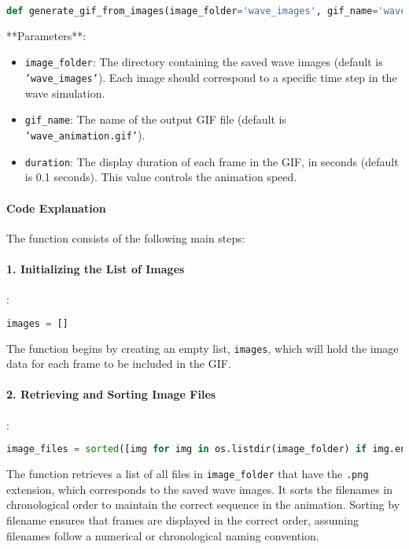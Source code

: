 \documentclass{article}
\begin{document}
			\begin{lstlisting}[language=Python, caption=Function Definition]
				def generate_gif_from_images(image_folder='wave_images', gif_name='wave_animation.gif', duration=0.1):
			\end{lstlisting}
			
			**Parameters**:
			\begin{itemize}
				\item \texttt{image\_folder}: The directory containing the saved wave images (default is \texttt{'wave\_images'}). Each image should correspond to a specific time step in the wave simulation.
				\item \texttt{gif\_name}: The name of the output GIF file (default is \texttt{'wave\_animation.gif'}).
				\item \texttt{duration}: The display duration of each frame in the GIF, in seconds (default is 0.1 seconds). This value controls the animation speed.
			\end{itemize}
			
			\paragraph{Code Explanation}
			
			The function consists of the following main steps:
			
			\paragraph{1. Initializing the List of Images}
			:
			\begin{lstlisting}[language=Python]
				images = []
			\end{lstlisting}
			The function begins by creating an empty list, \texttt{images}, which will hold the image data for each frame to be included in the GIF.
			
			\paragraph{2. Retrieving and Sorting Image Files}
			:
			\begin{lstlisting}[language=Python]
				image_files = sorted([img for img in os.listdir(image_folder) if img.endswith(".png")])
			\end{lstlisting}
			The function retrieves a list of all files in \texttt{image\_folder} that have the \texttt{.png} extension, which corresponds to the saved wave images. It sorts the filenames in chronological order to maintain the correct sequence in the animation. Sorting by filename ensures that frames are displayed in the correct order, assuming filenames follow a numerical or chronological naming convention.
			
\end{document}
